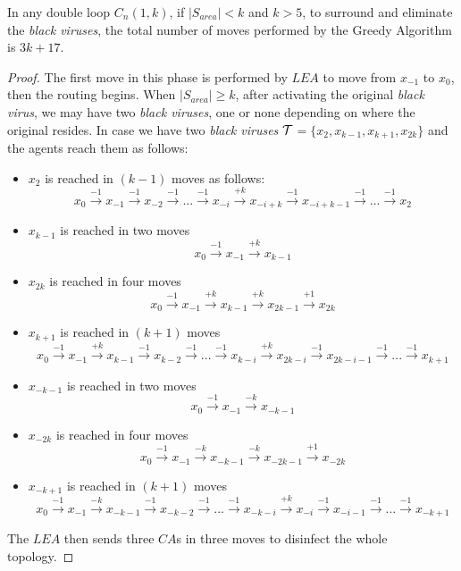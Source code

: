 \begin{theorem}
In any double loop  $C_n(1,k)$,  if $\left\vert{S_{area}}\right\vert < k$  and $k>5$, to surround and eliminate the {\it black viruses},
 the total number of moves performed by the Greedy Algorithm is $3k+17$.
\end{theorem}
\begin{proof}
The first move in this phase is performed by $LEA$ to move from $x_{-1}$ to $x_0$, then the routing begins. When  $\left\vert{S_{area}}\right\vert \ge k$, after activating the original {\it black virus}, we may have two {\it black viruses}, one \bv or none depending on where the original \bv resides.
In case we have two {\it black viruses}  ${\cal T}$$=\{x_{2},x_{k-1},x_{k+1},x_{2k}\}$ and the agents reach them as follows:
\begin{itemize}
\item $x_{2}$ is reached in $(k-1)$ moves as follows:
$$x_{0} \xrightarrow {-1} x_{-1} \xrightarrow {-1} x_{-2} \xrightarrow {-1}... \xrightarrow {-1} x_{-i} \xrightarrow {+k} x_{-i+k} \xrightarrow {-1} x_{-i+k-1} \xrightarrow {-1} ... \xrightarrow {-1} x_{2}$$
\item $x_{k-1}$ is reached in two moves
$$x_{0} \xrightarrow {-1} x_{-1} \xrightarrow {+k} x_{k-1}$$
\item $x_{2k}$ is reached in four moves
$$x_{0} \xrightarrow {-1} x_{-1} \xrightarrow {+k} x_{k-1} \xrightarrow {+k} x_{2k-1} \xrightarrow {+1} x_{2k}$$
\item $x_{k+1}$ is reached in $(k+1)$ moves
$$x_{0} \xrightarrow {-1} x_{-1} \xrightarrow {+k} x_{k-1} \xrightarrow {-1} x_{k-2} \xrightarrow {-1} ... \xrightarrow {-1} x_{k-i} \xrightarrow {+k} x_{2k-i} \xrightarrow {-1} x_{2k-i-1} \xrightarrow {-1} ... \xrightarrow {-1} x_{k+1}$$
 \item $x_{-k-1}$ is reached in two moves
$$x_{0} \xrightarrow {-1} x_{-1} \xrightarrow {-k} x_{-k-1}$$
\item $x_{-2k}$ is reached in four moves
$$x_{0} \xrightarrow {-1} x_{-1} \xrightarrow {-k} x_{-k-1} \xrightarrow {-k} x_{-2k-1} \xrightarrow {+1} x_{-2k}$$
\item $x_{-k+1}$ is reached in $(k+1)$ moves
$$x_{0} \xrightarrow {-1} x_{-1} \xrightarrow {-k} x_{-k-1} \xrightarrow {-1} x_{-k-2} \xrightarrow {-1} ... \xrightarrow {-1} x_{-k-i} \xrightarrow {+k} x_{-i} \xrightarrow {-1} x_{-i-1} \xrightarrow {-1} ... \xrightarrow {-1} x_{-k+1}$$
\end{itemize}
The $LEA$ then sends three $CA$s in three moves to disinfect the whole topology.
 
\end{proof}
